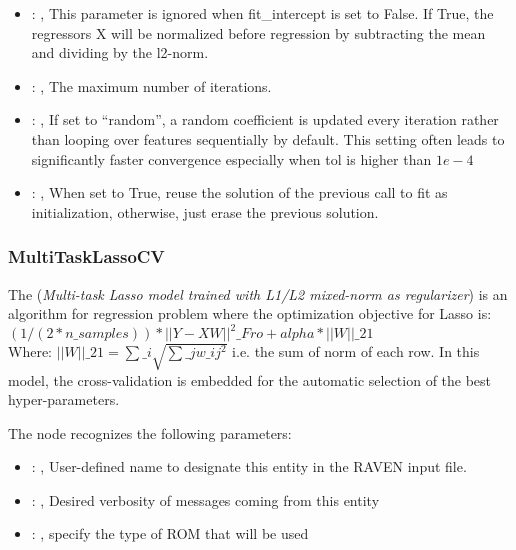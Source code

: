 \begin{itemize}
    \item {}: , 
      This parameter is ignored when fit\_intercept is set to False. If True,
      the regressors X will be normalized before regression by subtracting the mean and
      dividing by the l2-norm.

    \item {}: , 
      The maximum number of iterations.

    \item {}: , 
      If set to ``random'', a random coefficient is updated every iteration
      rather than looping over features sequentially by default. This setting
      often leads to significantly faster convergence especially when tol is higher than $1e-4$

    \item {}: , 
      When set to True, reuse the solution of the previous call
      to fit as initialization, otherwise, just erase the previous solution.
  \end{itemize}


\subsubsection{MultiTaskLassoCV}
  The  (\textit{Multi-task Lasso model trained
  with L1/L2 mixed-norm as regularizer}) is an algorithm for regression problem
  where the optimization objective for Lasso is:                         $(1 / (2 * n\_samples)) *
  ||Y - XW||^2\_{Fro} + alpha * ||W||\_{21}$                         \\Where:
  $||W||\_{21} = \sum\_i \sqrt{\sum\_j w\_{ij}^2}$                         i.e. the sum of norm of each
  row.                         In this model, the cross-validation is embedded for the automatic
  selection                         of the best hyper-parameters.

  The  node recognizes the following parameters:
    \begin{itemize}
      \item {}: , 
        User-defined name to designate this entity in the RAVEN input file.
      \item {}: , 
        Desired verbosity of messages coming from this entity
      \item {}: , 
        specify the type of ROM that will be used
  \end{itemize}

